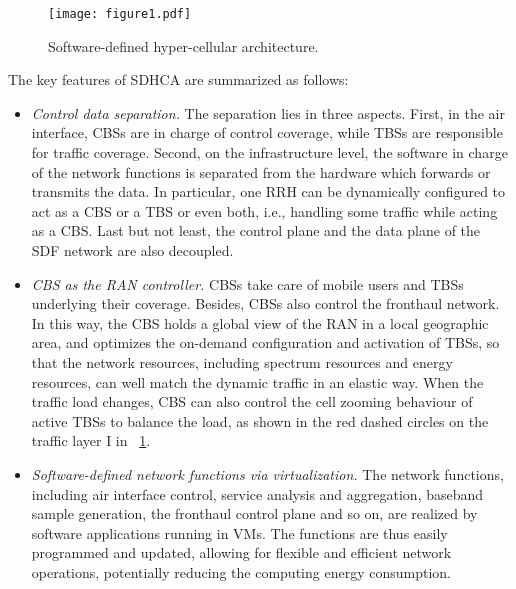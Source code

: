 \documentclass[12pt, draftclsnofoot,onecolumn]{IEEEtran}
\begin{document}
\begin{figure}[!t]
  \centering
  \texttt{[image: figure1.pdf]}
  \caption{Software-defined hyper-cellular architecture.}
  \label{fig:arch}
\end{figure}

The key features of SDHCA are summarized as follows:
\begin{itemize}
  \item \emph{Control data separation.} The separation lies in three aspects. First,
    in the air interface, CBSs are in charge of control coverage, while TBSs
    are responsible for traffic coverage. Second, on the infrastructure level,
    the software in charge of the network functions is separated from the
    hardware which forwards or transmits the data. In particular, one RRH can
    be dynamically configured to act as a CBS or a TBS or even both, i.e., handling some traffic while acting as a CBS. Last but not
    least, the control plane and the data plane of the SDF network are also
    decoupled.
  \item \emph{CBS as the RAN controller.} CBSs take care of mobile users and
    TBSs underlying their coverage. Besides, CBSs also control the fronthaul network.
    In this way, the CBS holds a
    global view of the RAN in a local geographic area, and optimizes the
    on-demand configuration and activation of TBSs, so that the network resources,
    including spectrum resources and energy resources, can well match the
    dynamic traffic in an elastic way. When the traffic load changes, CBS can also control the cell zooming behaviour of active TBSs to balance the
load, as shown in the red dashed circles on the traffic layer I in \figurename~\ref{fig:arch}.
  \item \emph{Software-defined network functions via virtualization.} The network
    functions, including air interface control, service analysis and
    aggregation, baseband sample generation, the fronthaul control plane and so on, are realized by software
    applications running in VMs. The functions are thus easily
    programmed and updated, allowing for flexible and efficient network
    operations, potentially reducing the computing energy consumption.
\end{itemize}
\end{document}
